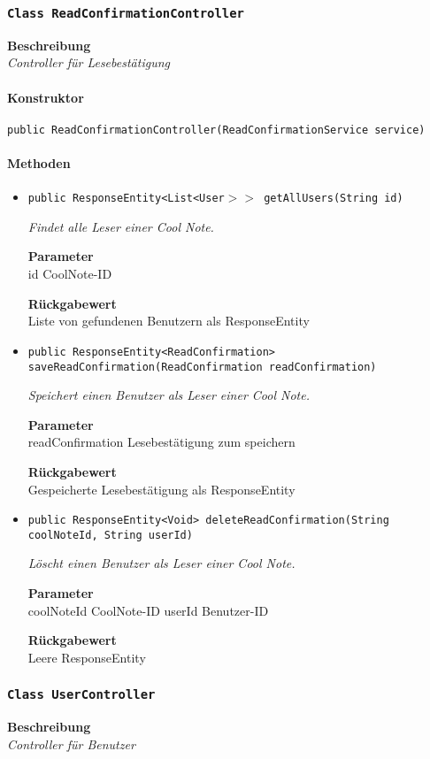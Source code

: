     \subsubsection{\texttt{Class ReadConfirmationController}}
    \textbf{Beschreibung} \\
    \textit{Controller für Lesebestätigung}
    \paragraph*{Konstruktor}
    \texttt{public ReadConfirmationController(ReadConfirmationService service)}
    \paragraph*{Methoden}
    \begin{itemize}
    	\item{\texttt{public ResponseEntity<List<User$>>$ getAllUsers(String id)}}
    	
    	\textit{Findet alle Leser einer Cool Note.}
    	
    	\textbf{Parameter} \\
    	id CoolNote-ID
    	
    	\textbf{Rückgabewert} \\
    	Liste von gefundenen Benutzern als ResponseEntity        \item{\texttt{public ResponseEntity<ReadConfirmation> saveReadConfirmation(ReadConfirmation readConfirmation)}}
    	
    	\textit{Speichert einen Benutzer als Leser einer Cool Note.}
    	
    	\textbf{Parameter} \\
    	readConfirmation Lesebestätigung zum speichern
    	
    	\textbf{Rückgabewert} \\
    	Gespeicherte Lesebestätigung als ResponseEntity        \item{\texttt{public ResponseEntity<Void> deleteReadConfirmation(String coolNoteId, String userId)}}
    	
    	\textit{Löscht einen Benutzer als Leser einer Cool Note.}
    	
    	\textbf{Parameter} \\
    	coolNoteId CoolNote-ID
    	userId Benutzer-ID
    	
    	\textbf{Rückgabewert} \\
    	Leere ResponseEntity
    \end{itemize}
    \subsubsection{\texttt{Class UserController}}
    \textbf{Beschreibung} \\
    \textit{Controller für Benutzer}
